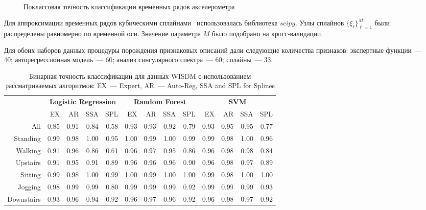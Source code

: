 \begin{figure}[!ht]
	\\
	\caption{Поклассовая точность классификации временных рядов акселерометра}
	\label{ch6:fig:feature_union_results}
\end{figure}

Для аппроксимации временных рядов кубическими сплайнами~\cite{deboor1978splines} использовалась библиотека $scipy$. 
Узлы сплайнов $\{\xi_{\ell}\}_{\ell = 1}^M$ были распределены равномерно по временной оси.
Значение параметра $M$ было подобрано на кросс-валидации.

Для обоих наборов данных процедуры порождения признаковых описаний дали следующие количества признаков: экспертные функции~--- 40; авторегрессионная модель~--- 60; анализ сингулярного спектра~--- 60; сплайны~--- 33.

\begin{table}[!ht]
	\centering
	\caption{Бинарная точность классификации для данных WISDM с использованием рассматриваемых алгоритмов: EX~--- Expert, AR~--- Auto-Reg, SSA and  SPL for Splines}
	\footnotesize
	\begin{tabular}{r|rrrr|rrrr|rrrr|}
		& \multicolumn{4}{c|}{\textbf{Logistic Regression}} & \multicolumn{4}{c|}{\textbf{Random Forest}} & \multicolumn{4}{c|}{\textbf{SVM}}          \\ \cline{2-13} 
		& EX   & AR   & SSA   & SPL  & EX  & AR & SSA & SPL & EX & AR & SSA & SPL \\ \hline
		All& 0.85 & 0.91 & 0.84 & 0.58 & 0.93 & 0.93 & 0.92 & 0.79 & 0.93 & 0.95 & 0.95 & 0.77 \\
		Standing& 0.99 & 0.98 & 1.00 & 0.95 & 1.00 & 0.99 & 1.00 & 0.99 & 0.99 & 0.98 & 1.00 & 0.96 \\
		Walking& 0.91 & 0.96 & 0.86 & 0.61 & 0.96 & 0.97 & 0.95 & 0.86 & 0.96 & 0.98 & 0.98 & 0.84 \\
		Upstairs& 0.91 & 0.95 & 0.91 & 0.89 & 0.96 & 0.96 & 0.96 & 0.90 & 0.96 & 0.98 & 0.97 & 0.89 \\
		Sitting& 0.99 & 0.98 & 1.00 & 0.99 & 1.00 & 0.99 & 1.00 & 1.00 & 0.99 & 0.98 & 1.00 & 1.00 \\
		Jogging& 0.98 & 0.99 & 0.99 & 0.80 & 0.99 & 0.99 & 0.99 & 0.92 & 0.99 & 0.99 & 0.99 & 0.93 \\
		Downstairs& 0.93 & 0.96 & 0.94 & 0.92 & 0.96 & 0.97 & 0.96 & 0.92 & 0.96 & 0.98 & 0.97 & 0.92 \\ \hline
	\end{tabular}
	\label{ch6:tbl:wisdm_methods_results}
\end{table}

